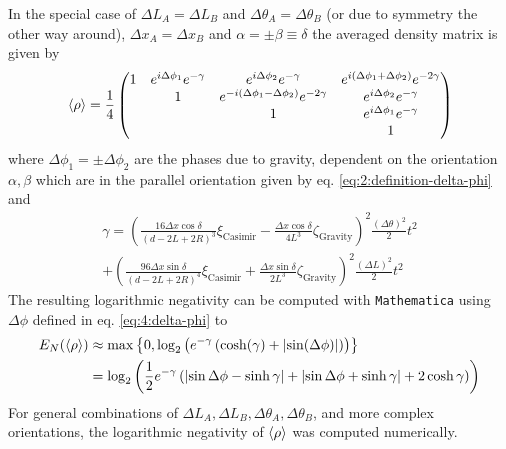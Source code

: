 In the special case of $\Delta L_A = \Delta L_B$ and $\Delta \theta_A = \Delta \theta_B$ (or due to symmetry the other way around), $\Delta x_A = \Delta x_B$ and $\alpha = \pm \beta \equiv \delta$ the averaged density matrix is given by
\begin{equation}
  \left\langle\rho\right\rangle = \frac{1}{4}\begin{pmatrix}
    1 & e^{i \Delta \phi_1}e^{-\gamma} & e^{i \Delta \phi_2}e^{-\gamma} & e^{i(\Delta \phi_1 + \Delta \phi_2)}e^{-2\gamma}\\
     & 1 & e^{-i(\Delta \phi_1 - \Delta \phi_2)}e^{-2\gamma} & e^{i \Delta \phi_2}e^{-\gamma} \\
     & & 1 & e^{i \Delta \phi_1}e^{-\gamma} \\
     & & & 1
  \end{pmatrix}
\end{equation}
where $\Delta \phi_{1} = \pm \Delta \phi_{2}$ are the phases due to gravity, dependent on the orientation $\alpha, \beta$ which are in the parallel orientation given by eq. \eqref{eq:2:definition-delta-phi} and
\begin{multline}
  \gamma = \left(\frac{16\Delta x \cos\delta}{(d - 2L + 2R)^3}\xi_\mathrm{Casimir} - \frac{\Delta x \cos\delta}{4 L^3}\zeta_\mathrm{Gravity}\right)^2 \frac{(\Delta \theta)^2}{2} t^2 \\
  + \left(\frac{96\Delta x \sin\delta}{(d - 2L + 2R)^4}\xi_\mathrm{Casimir} + \frac{\Delta x \sin\delta}{2 L^3}\zeta_\mathrm{Gravity}\right)^2 \frac{(\Delta L)^2}{2} t^2
\end{multline}
The resulting logarithmic negativity can be computed with \texttt{Mathematica} using $\Delta \phi$ defined in eq. \eqref{eq:4:delta-phi} to
\begin{align}
  E_N(\left\langle\rho\right\rangle) &\approx \max\left\{0, \log_2\left(e^{-\gamma}\left(\cosh(\gamma) + \left\lvert\sin(\Delta \phi)\right\rvert\right)\right)\right\} \\
  &= \log_2\left(\frac{1}{2}e^{-\gamma}\left(\left\lvert\sin\Delta \phi-\sinh\gamma\right\rvert + \left\lvert\sin\Delta \phi+\sinh\gamma\right\rvert + 2\cosh\gamma\right)\right)
\end{align}
For general combinations of $\Delta L_A, \Delta L_B, \Delta \theta_A,\Delta \theta_B$, and more complex orientations, the logarithmic negativity of $\left\langle\rho\right\rangle$ was computed numerically.


